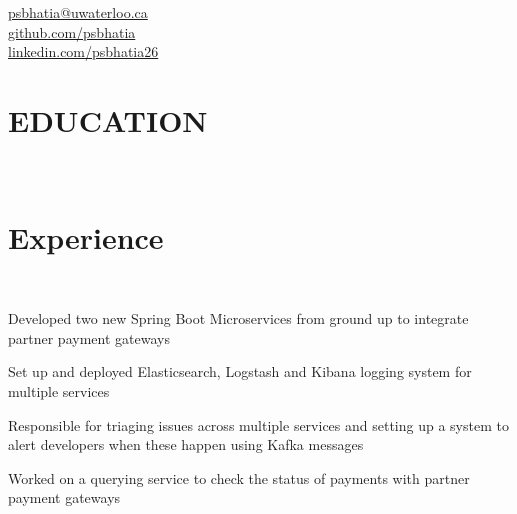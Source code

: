 \documentclass[]{hieudo-build}
\begin{document}
%
%
\color{myyellow}
{
	\color{myblue}\faEnvelope \href{mailto:psbhatia@uwaterloo.ca}{ psbhatia@uwaterloo.ca}\\
	\faGithub \href{https://github.com/psbhatia}{   github.com/psbhatia}\\
	\faLinkedinSquare \href{https://www.linkedin.com/in/psbhatia26}{   linkedin.com/psbhatia26}
}

\begin{minipage}[t]{1.0\textwidth} 

\section{EDUCATION}
\\
\color{myyellow}
\vspace{0.9em} %



\section{Experience}

\\
\color{myyellow}
\vspace{0.9em} %
\begin{tightemize}
\item Developed two new Spring Boot Microservices from ground up to integrate partner payment gateways 
\item Set up and deployed Elasticsearch, Logstash and Kibana logging system for multiple services
\item Responsible for triaging issues across multiple services and setting up a system to alert developers when these happen using Kafka messages
\item Worked on a querying service to check the status of payments with partner payment gateways
\end{tightemize}
\sectionsep


\end{minipage}
\end{document}
